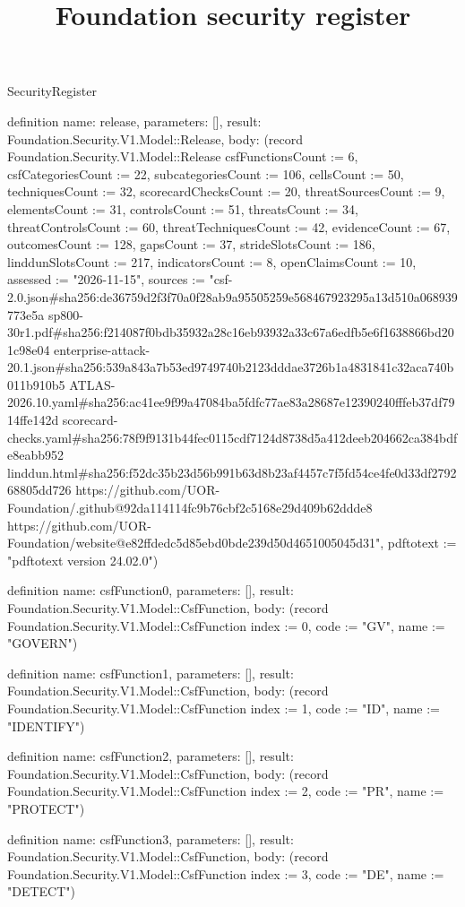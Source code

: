\begin{lexlean}{SecurityRegister}
\title{Foundation security register}
\begin{semanticmodule}
definition{
  name: release,
  parameters: [],
  result: Foundation.Security.V1.Model::Release,
  body: (record Foundation.Security.V1.Model::Release {csfFunctionsCount := 6, csfCategoriesCount := 22, subcategoriesCount := 106, cellsCount := 50, techniquesCount := 32, scorecardChecksCount := 20, threatSourcesCount := 9, elementsCount := 31, controlsCount := 51, threatsCount := 34, threatControlsCount := 60, threatTechniquesCount := 42, evidenceCount := 67, outcomesCount := 128, gapsCount := 37, strideSlotsCount := 186, linddunSlotsCount := 217, indicatorsCount := 8, openClaimsCount := 10, assessed := "2026-11-15", sources := "csf-2.0.json#sha256:de36759d2f3f70a0f28ab9a95505259e568467923295a13d510a068939773e5a sp800-30r1.pdf#sha256:f214087f0bdb35932a28c16eb93932a33c67a6edfb5e6f1638866bd201c98e04 enterprise-attack-20.1.json#sha256:539a843a7b53ed9749740b2123dddae3726b1a4831841c32aca740b011b910b5 ATLAS-2026.10.yaml#sha256:ac41ee9f99a47084ba5fdfc77ae83a28687e12390240fffeb37df7914ffe142d scorecard-checks.yaml#sha256:78f9f9131b44fec0115cdf7124d8738d5a412deeb204662ca384bdfe8eabb952 linddun.html#sha256:f52dc35b23d56b991b63d8b23af4457c7f5fd54ce4fe0d33df279268805dd726 https://github.com/UOR-Foundation/.github@92da114114fc9b76cbf2c5168e29d409b62ddde8 https://github.com/UOR-Foundation/website@e82ffdedc5d85ebd0bde239d50d4651005045d31", pdftotext := "pdftotext version 24.02.0"})
}

definition{
  name: csfFunction0,
  parameters: [],
  result: Foundation.Security.V1.Model::CsfFunction,
  body: (record Foundation.Security.V1.Model::CsfFunction {index := 0, code := "GV", name := "GOVERN"})
}

definition{
  name: csfFunction1,
  parameters: [],
  result: Foundation.Security.V1.Model::CsfFunction,
  body: (record Foundation.Security.V1.Model::CsfFunction {index := 1, code := "ID", name := "IDENTIFY"})
}

definition{
  name: csfFunction2,
  parameters: [],
  result: Foundation.Security.V1.Model::CsfFunction,
  body: (record Foundation.Security.V1.Model::CsfFunction {index := 2, code := "PR", name := "PROTECT"})
}

definition{
  name: csfFunction3,
  parameters: [],
  result: Foundation.Security.V1.Model::CsfFunction,
  body: (record Foundation.Security.V1.Model::CsfFunction {index := 3, code := "DE", name := "DETECT"})
}


\end{semanticmodule}
\end{lexlean}
